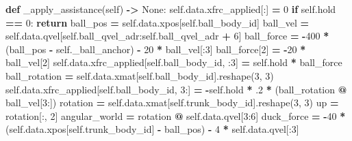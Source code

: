 \documentclass[
  american,
  11pt,
  letterpaper,
]{article}
\newenvironment{Shaded}{\begin{snugshade}}{\end{snugshade}}
\newcommand{\ControlFlowTok}[1]{\textcolor[rgb]{0.13,0.29,0.53}{\textbf{#1}}}
\newcommand{\DecValTok}[1]{\textcolor[rgb]{0.00,0.00,0.81}{#1}}
\newcommand{\FloatTok}[1]{\textcolor[rgb]{0.00,0.00,0.81}{#1}}
\newcommand{\KeywordTok}[1]{\textcolor[rgb]{0.13,0.29,0.53}{\textbf{#1}}}
\newcommand{\NormalTok}[1]{#1}
\newcommand{\OperatorTok}[1]{\textcolor[rgb]{0.81,0.36,0.00}{\textbf{#1}}}
\newcommand{\VariableTok}[1]{\textcolor[rgb]{0.00,0.00,0.00}{#1}}
\renewenvironment{Shaded}{\par\smallskip}{\par\smallskip}
\begin{document}
\begin{Shaded}
\begin{Highlighting}[]
    \KeywordTok{def}\NormalTok{ \_apply\_assistance(}\VariableTok{self}\NormalTok{) }\OperatorTok{{-}\textgreater{}} \VariableTok{None}\NormalTok{:}
        \VariableTok{self}\NormalTok{.data.xfrc\_applied[:] }\OperatorTok{=} \DecValTok{0}
        \ControlFlowTok{if} \VariableTok{self}\NormalTok{.hold }\OperatorTok{==} \DecValTok{0}\NormalTok{:}
            \ControlFlowTok{return}
\NormalTok{        ball\_pos }\OperatorTok{=} \VariableTok{self}\NormalTok{.data.xpos[}\VariableTok{self}\NormalTok{.ball\_body\_id]}
\NormalTok{        ball\_vel }\OperatorTok{=} \VariableTok{self}\NormalTok{.data.qvel[}\VariableTok{self}\NormalTok{.ball\_qvel\_adr:}\VariableTok{self}\NormalTok{.ball\_qvel\_adr }\OperatorTok{+} \DecValTok{6}\NormalTok{]}
\NormalTok{        ball\_force }\OperatorTok{=} \OperatorTok{{-}}\DecValTok{400} \OperatorTok{*}\NormalTok{ (ball\_pos }\OperatorTok{{-}} \VariableTok{self}\NormalTok{.\_ball\_anchor) }\OperatorTok{{-}} \DecValTok{20} \OperatorTok{*}\NormalTok{ ball\_vel[:}\DecValTok{3}\NormalTok{]}
\NormalTok{        ball\_force[}\DecValTok{2}\NormalTok{] }\OperatorTok{=} \OperatorTok{{-}}\DecValTok{20} \OperatorTok{*}\NormalTok{ ball\_vel[}\DecValTok{2}\NormalTok{]}
        \VariableTok{self}\NormalTok{.data.xfrc\_applied[}\VariableTok{self}\NormalTok{.ball\_body\_id, :}\DecValTok{3}\NormalTok{] }\OperatorTok{=} \VariableTok{self}\NormalTok{.hold }\OperatorTok{*}\NormalTok{ ball\_force}
\NormalTok{        ball\_rotation }\OperatorTok{=} \VariableTok{self}\NormalTok{.data.xmat[}\VariableTok{self}\NormalTok{.ball\_body\_id].reshape(}\DecValTok{3}\NormalTok{, }\DecValTok{3}\NormalTok{)}
        \VariableTok{self}\NormalTok{.data.xfrc\_applied[}\VariableTok{self}\NormalTok{.ball\_body\_id, }\DecValTok{3}\NormalTok{:] }\OperatorTok{=} \OperatorTok{{-}}\VariableTok{self}\NormalTok{.hold }\OperatorTok{*} \FloatTok{.2} \OperatorTok{*}\NormalTok{ (ball\_rotation }\OperatorTok{@}\NormalTok{ ball\_vel[}\DecValTok{3}\NormalTok{:])}
\NormalTok{        rotation }\OperatorTok{=} \VariableTok{self}\NormalTok{.data.xmat[}\VariableTok{self}\NormalTok{.trunk\_body\_id].reshape(}\DecValTok{3}\NormalTok{, }\DecValTok{3}\NormalTok{)}
\NormalTok{        up }\OperatorTok{=}\NormalTok{ rotation[:, }\DecValTok{2}\NormalTok{]}
\NormalTok{        angular\_world }\OperatorTok{=}\NormalTok{ rotation }\OperatorTok{@} \VariableTok{self}\NormalTok{.data.qvel[}\DecValTok{3}\NormalTok{:}\DecValTok{6}\NormalTok{]}
\NormalTok{        duck\_force }\OperatorTok{=} \OperatorTok{{-}}\DecValTok{40} \OperatorTok{*}\NormalTok{ (}\VariableTok{self}\NormalTok{.data.xpos[}\VariableTok{self}\NormalTok{.trunk\_body\_id] }\OperatorTok{{-}}\NormalTok{ ball\_pos) }\OperatorTok{{-}} \DecValTok{4} \OperatorTok{*} \VariableTok{self}\NormalTok{.data.qvel[:}\DecValTok{3}\NormalTok{]}

\end{Highlighting}
\end{Shaded}
\end{document}
